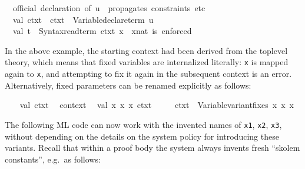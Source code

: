 \begin{isabellebody}
\isanewline
\ \ {\isacharparenleft}{\isacharasterisk}official\ declaration\ of\ u\ {\isacharminus}{\isacharminus}\ propagates\ constraints\ etc{\isachardot}{\isacharasterisk}{\isacharparenright}\isanewline
\ \ val\ ctxt{}\ {\isacharequal}\ ctxt{}\ {\isacharbar}{\isachargreater}\ Variable{\isachardot}declare{\isacharunderscore}term\ u{\isacharsemicolon}\isanewline
\ \ val\ t{}\ {\isacharequal}\ Syntax{\isachardot}read{\isacharunderscore}term\ ctxt{}\ {\isachardoublequote}x{\isachardoublequote}{\isacharsemicolon}\ \ {\isacharparenleft}{\isacharasterisk}x{\isacharcolon}{\isacharcolon}nat\ is\ enforced{\isacharasterisk}{\isacharparenright}\isanewline
{\isacharverbatimclose}%
\endisatagML
{\isafoldML}%
%
\isadelimML
%
\endisadelimML
%
\begin{isamarkuptext}%
In the above example, the starting context had been derived
  from the toplevel theory, which means that fixed variables are
  internalized literally: \verb|x| is mapped again to
  \verb|x|, and attempting to fix it again in the subsequent
  context is an error.  Alternatively, fixed parameters can be renamed
  explicitly as follows:%
\end{isamarkuptext}%
\isamarkuptrue%
%
\isadelimML
%
\endisadelimML
%
\isatagML
{}\isamarkupfalse%
\ {\isacharverbatimopen}\isanewline
\ \ val\ ctxt{}\ {\isacharequal}\ %
\isaantiq
context%
\endisaantiq
{\isacharsemicolon}\isanewline
\ \ val\ {\isacharparenleft}{\isacharbrackleft}x{}{\isacharcomma}\ x{}{\isacharcomma}\ x{}{\isacharbrackright}{\isacharcomma}\ ctxt{}{\isacharparenright}\ {\isacharequal}\isanewline
\ \ \ \ ctxt{}\ {\isacharbar}{\isachargreater}\ Variable{\isachardot}variant{\isacharunderscore}fixes\ {\isacharbrackleft}{\isachardoublequote}x{\isachardoublequote}{\isacharcomma}\ {\isachardoublequote}x{\isachardoublequote}{\isacharcomma}\ {\isachardoublequote}x{\isachardoublequote}{\isacharbrackright}{\isacharsemicolon}\isanewline
{\isacharverbatimclose}%
\endisatagML
{\isafoldML}%
%
\isadelimML
%
\endisadelimML
%
\begin{isamarkuptext}%
The following ML code can now work with the invented names of
  \verb|x1|, \verb|x2|, \verb|x3|, without depending on
  the details on the system policy for introducing these variants.
  Recall that within a proof body the system always invents fresh
  ``skolem constants'', e.g.\ as follows:%
\end{isamarkuptext}%
\isamarkuptrue%
\isamarkupfalse%

\end{isabellebody}
